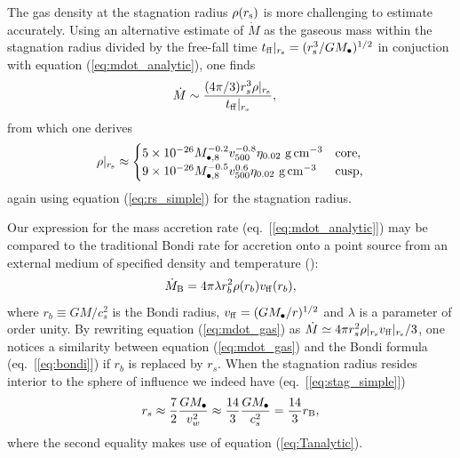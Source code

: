 \documentclass[usenatbib,fleqn]{mn2e}
\newcommand{\rs}{r_s}
\newcommand{\rb}{r_b}
\newcommand{\Mbh}[1][]{M_{\bullet#1}}
\newcommand{\Mbheight}{M_{\bullet,8}}
\newcommand{\vwO}{v_{w}}
\newcommand{\tff}{t_{\rm ff}}
\begin{document}
The gas density at the stagnation radius $\rho(r_{\rm s})$ is more challenging to estimate accurately.  Using an alternative estimate of $\dot{M}$ as the gaseous mass within the stagnation radius divided by the free-fall time $t_{\rm ff}|_{r_{\rm s}} = (r_{\rm s}^{3}/GM_{\bullet})^{1/2}$ in conjuction with equation (\ref{eq:mdot_analytic}), one finds
\begin{align}
  &\dot{M}\sim\frac{(4 \pi/3) \rs^3 \rho|_{r_{\rm s}}}{\tff|_{r_{\rm s}}},
  \label{eq:mdot_gas}
\end{align}
from which one derives 
\begin{align}
  \rho|_{r_{\rm s}}\approx
  \begin{cases}
    5 \times 10^{-26} \Mbheight^{-0.2} v_{500}^{-0.8}  \eta_{0.02} \,
    \, {\rm g \, cm^{-3}}& \text{core},\\
    9 \times 10^{-26}  \Mbheight^{-0.5} v_{500}^{0.6}  \eta_{0.02} \,\, {\rm g \,cm^{-3}} & \text{cusp},
  \end{cases}
  \label{eq:rhors}
\end{align}
again using equation (\ref{eq:rs_simple}) for the stagnation radius.  


Our expression for the mass accretion rate (eq.~[\ref{eq:mdot_analytic}]) may be compared to the traditional Bondi rate for accretion onto a point source from an external medium of specified density and temperature (\citealt{Bondi52}):
\begin{align}
  \dot{M}_{\rm B} =4\pi \lambda r_b^2 \rho(r_b) v_{\rm ff}(r_b),
\label{eq:bondi}
\end{align}
where $r_b \equiv GM/c_{s}^{2}$ is the Bondi radius, $v_{\rm ff} = (GM_{\bullet}/r)^{1/2}$ and $\lambda$ is a parameter of order unity.  By rewriting equation (\ref{eq:mdot_gas}) as $\dot{M}\simeq 4\pi \rs^2 \rho|_{r_{\rm s}} v_{\rm ff}|_{r_{\rm s}}/3$,
one notices a similarity between equation (\ref{eq:mdot_gas}) and the Bondi formula (eq.~[\ref{eq:bondi}]) if $\rb$ is replaced by $\rs$.  When the stagnation radius resides interior to the sphere of influence we indeed have (eq.~[\ref{eq:stag_simple}])
\begin{align}
  \rs\approx\frac{7}{2}\frac{G \Mbh}{\vwO^2} \approx \frac{14}{3}\frac{GM_{\bullet}}{c_{s}^{2}} = \frac{14}{3}r_{\rm B},
  \label{eq:rs_simple}
\end{align}
where the second equality makes use of equation (\ref{eq:Tanalytic}). 
\end{document}
